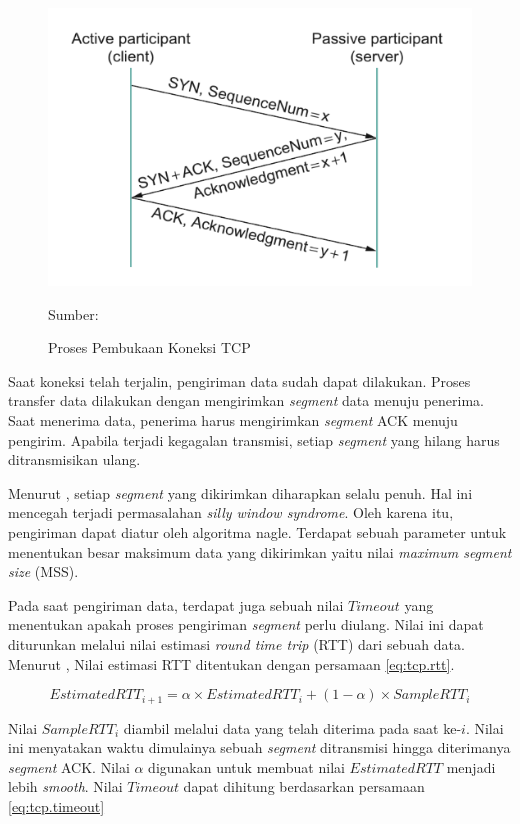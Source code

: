 \begin{figure}[!h]
  \centering
  \includegraphics[width=\textwidth]{chapters/res/chapter-2/img/tcp.open.png}
  \caption{Proses Pembukaan Koneksi TCP} \label{fig:tcp.open}
  Sumber: \textcite{peterson2011}
\end{figure}

Saat koneksi telah terjalin, pengiriman data sudah dapat dilakukan. Proses transfer data dilakukan dengan mengirimkan \emph{segment} data menuju penerima. Saat menerima data, penerima harus mengirimkan \emph{segment} ACK menuju pengirim. Apabila terjadi kegagalan transmisi, setiap \emph{segment} yang hilang harus ditransmisikan ulang.

Menurut \textcite{peterson2011}, setiap \emph{segment} yang dikirimkan diharapkan selalu penuh. Hal ini mencegah terjadi permasalahan \emph{silly window syndrome}. Oleh karena itu, pengiriman dapat diatur oleh algoritma nagle. Terdapat sebuah parameter untuk menentukan besar maksimum data yang dikirimkan yaitu nilai \emph{maximum segment size} (MSS).

Pada saat pengiriman data, terdapat juga sebuah nilai $Timeout$ yang menentukan apakah proses pengiriman \emph{segment} perlu diulang. Nilai ini dapat diturunkan melalui nilai estimasi \emph{round time trip} (RTT) dari sebuah data. Menurut \textcite{peterson2011}, Nilai estimasi RTT ditentukan dengan persamaan \ref{eq:tcp.rtt}.

\begin{equation}
  \label{eq:tcp.rtt}
  EstimatedRTT_{i+1} = \alpha \times EstimatedRTT_i + (1 - \alpha) \times SampleRTT_i
\end{equation}

Nilai $SampleRTT_i$ diambil melalui data yang telah diterima pada saat ke-$i$. Nilai ini menyatakan waktu dimulainya sebuah \emph{segment} ditransmisi hingga diterimanya \emph{segment} ACK. Nilai $\alpha$ digunakan untuk membuat nilai $EstimatedRTT$ menjadi lebih \emph{smooth}. Nilai $Timeout$ dapat dihitung berdasarkan persamaan \ref{eq:tcp.timeout}

